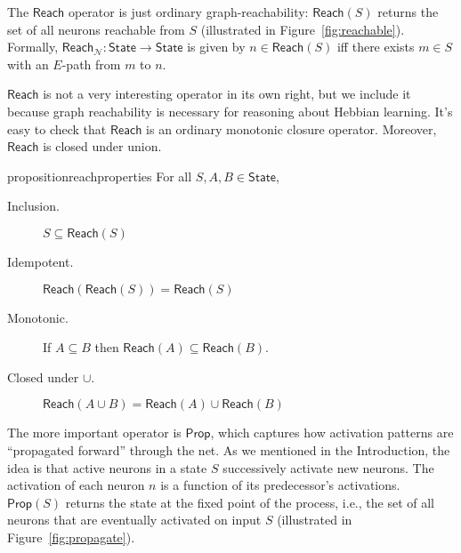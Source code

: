 \documentclass[letterpaper]{article}
\theoremstyle{definition}
\newtheorem{proposition}{Proposition}
\newcommand{\State}{\mathsf{State}}
\newcommand{\Net}{\mathcal{N}}
\newcommand{\Prop}{\mathsf{Prop}}
\newcommand{\Reach}{\mathsf{Reach}}
\begin{document}
The $\Reach$ operator is just ordinary graph-reachability: $\Reach(S)$ returns the set of all neurons reachable from $S$ (illustrated in Figure~\ref{fig:reachable}).  Formally, $\Reach_\Net : \State \to \State$ is given by $n \in \Reach(S)$ iff there exists $m \in S$ with an $E$-path from $m$ to $n$.

$\Reach$ is not a very interesting operator in its own right, but we include it because graph reachability is necessary for reasoning about Hebbian learning. It's easy to check that $\Reach$ is an ordinary monotonic closure operator.  Moreover, $\Reach$ is closed under union.
\begin{restatable}{proposition}{reachproperties}
    \label{reach-properties}
    For all $S, A, B \in \State$,
    \begin{description}
        \item[Inclusion.] $S \subseteq \Reach(S)$
        \item[Idempotent.] $\Reach(\Reach(S)) = \Reach(S)$
        \item[Monotonic.] If $A \subseteq B$ then $\Reach(A) \subseteq \Reach(B)$.
        \item[Closed under $\cup$.] $\Reach(A \cup B) = \Reach(A) \cup \Reach(B)$
    \end{description}
\end{restatable}

The more important operator is $\Prop$, which captures how activation patterns are ``propagated forward'' through the net.  As we mentioned in the Introduction, the idea is that active neurons in a state $S$ successively activate new neurons.  The activation of each neuron $n$ is a function of its predecessor's activations.  $\Prop(S)$ returns the state at the fixed point of the process, i.e., the set of all neurons that are eventually activated on input $S$ (illustrated in Figure~\ref{fig:propagate}).
\end{document}
